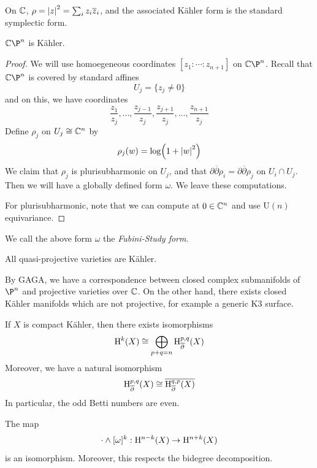 \documentclass{article}
\begin{document}
\begin{example}
    On \(\mathbb{C}\), \(\rho = \abs{z}^2 = \sum_i z_i\overline z_i\), and the associated K\"ahler form is the standard symplectic form.
\end{example}

\begin{proposition}
    \(\C\P^n\) is K\"ahler.
\end{proposition}

\begin{proof}
    We will use homoegeneous coordinates \([z_1: \cdots : z_{n+1}]\) on \(\C\P^n\). Recall that \(\C\P^n\) is covered by standard affines
    \[U_j = \{z_j \ne 0\}\]
    and on this, we have coordinates
    \[\frac{z_1}{z_j}, \dots, \frac{z_{j-1}}{z_j}, \frac{z_{j+1}}{z_j}, \dots, \frac{z_{n+1}}{z_j}\]
    Define \(\rho_j\) on \(U_j \cong \mathbb{C}^n\) by
    \[\rho_j(w) = \log(1 + \abs{w}^2)\]
    We claim that \(\rho_j\) is plurisubharmonic on \(U_j\), and that \(\partial\overline\partial \rho_i = \partial\overline\partial \rho_j\) on \(U_i \cap U_j\). Then we will have a globally defined form \(\omega\). We leave these computations.

    For plurisubharmonic, note that we can compute at \(0 \in \mathbb{C}^n\) and use \(\mathrm{U}(n)\) equivariance.
\end{proof}

We call the above form \(\omega\) the \emph{Fubini-Study form}.

\begin{corollary}
    All quasi-projective varieties are K\"ahler.
\end{corollary}

By GAGA, we have a correspondence between closed complex submanifolds of \(\P^n\) and projective varieties over \(\mathbb{C}\). On the other hand, there exists closed K\"ahler manifolds which are not projective, for example a generic K3 surface.

\begin{theorem}
    [Hodge] If \(X\) is compact K\"ahler, then there exists isomorphisms
    \[\mathrm{H}^k(X) \cong \bigoplus_{p + q = n}\mathrm{H}^{p, q}_{\overline\partial}(X)\]
    Moreover, we have a natural isomorphism
    \[\mathrm{H}^{p, q}_{\overline\partial}(X) \cong \overline{\mathrm{H}^{q, p}_{\overline\partial}(X)}\]
    In particular, the odd Betti numbers are even.
\end{theorem}

\begin{theorem}
    [Lefschetz]
    The map
    \[\cdot \wedge [\omega]^k : \mathrm{H}^{n-k}(X) \to \mathrm{H}^{n+k}(X)\]
    is an isomorphism. Moreover, this respects the bidegree decomposition.
\end{theorem}
\end{document}
